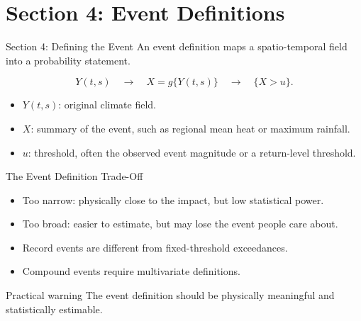 \documentclass[aspectratio=169]{beamer}
\begin{document}
\section{Section 4: Event Definitions}

\begin{frame}{Section 4: Defining the Event}
  An event definition maps a spatio-temporal field into a probability statement.

  \[
    Y(t,s) \quad \longrightarrow \quad X = g\{Y(t,s)\} \quad \longrightarrow \quad \{X > u\}.
  \]

  \begin{itemize}
    \item $Y(t,s)$: original climate field.
    \item $X$: summary of the event, such as regional mean heat or maximum rainfall.
    \item $u$: threshold, often the observed event magnitude or a return-level threshold.
  \end{itemize}
\end{frame}

\begin{frame}{The Event Definition Trade-Off}
  \begin{itemize}
    \item Too narrow: physically close to the impact, but low statistical power.
    \item Too broad: easier to estimate, but may lose the event people care about.
    \item Record events are different from fixed-threshold exceedances.
    \item Compound events require multivariate definitions.
  \end{itemize}

  \vspace{0.2cm}
  \begin{alertblock}{Practical warning}
    The event definition should be physically meaningful and statistically estimable.
  \end{alertblock}
\end{frame}
\end{document}
